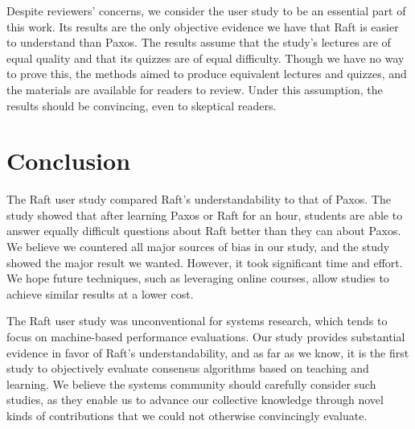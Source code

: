 Despite reviewers' concerns, we consider the user study to be an
essential part of this work. Its results are the only objective evidence
we have that Raft is easier to understand than Paxos. The results assume
that the study's lectures are of equal quality and that its quizzes are
of equal difficulty. Though we have no way to prove this, the methods
aimed to produce equivalent lectures and quizzes, and the materials are
available for readers to review. Under this assumption, the results
should be convincing, even to skeptical readers.


\section{Conclusion}

The Raft user study compared Raft's understandability to that of Paxos.
The study showed that after learning Paxos or Raft for an hour,
students are able to answer equally difficult questions about Raft
better than they can about Paxos. We believe we countered all major
sources of bias in our study, and the study showed the major result we
wanted. However, it took significant time and effort. We hope future
techniques, such as leveraging online courses, allow studies to achieve
similar results at a lower cost.

The Raft user study was unconventional for systems research, which tends
to focus on machine-based performance evaluations. Our study provides
substantial evidence in favor of Raft's understandability, and as far as
we know, it is the first study to objectively evaluate consensus
algorithms based on teaching and learning. We believe the systems
community should carefully consider such studies, as they enable us to
advance our collective knowledge through novel kinds of contributions
that we could not otherwise convincingly evaluate.
